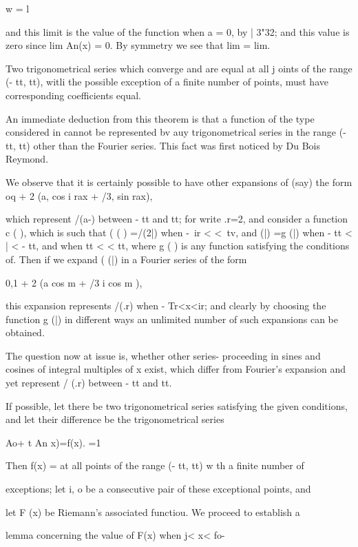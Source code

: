 {w = l

and this limit is the value of the function when a = 0, by | 3"32;
and this value is zero since lim An(x) = 0. By symmetry we see that
lim = lim.


Two trigonometrical series which converge and are equal at all j oints
of the range (- tt, tt), witli the possible exception of a finite
number of points, must have corresponding coefficients equal.

An immediate deduction from this theorem is that a function of the
type considered in cannot be represented bv auy trigonometrical
series in the range (- tt, tt) other than the Fourier series. This
fact was first noticed by Du Bois Reymond.

We observe that it is certainly possible to have other expansions of
(say) the form oq + 2 (a, cos i rax + /3, sin rax),

which represent /(a-) between - tt and tt; for write .r=2, and
consider a function c ( ), which is such that ( ( ) =/(2|) when -\ ir
< <\ tv, and (|) =g (|) when - tt < | < - tt, and when tt < < tt,
where g ( ) is any function satisfying the conditions of. Then
if we expand ( (|) in a Fourier series of the form

0,1 + 2 (a cos m + /3 i cos m ),

this expansion represents /(.r) when - Tr<x<ir; and clearly by
choosing the function g (|) in different ways an unlimited number of
such expansions can be obtained.

The question now at issue is, whether other series- proceeding in
sines and cosines of integral multiples of x exist, which differ from
Fourier's expansion and yet represent / (.r) between - tt and tt.

If possible, let there be two trigonometrical series satisfying the
given conditions, and let their difference be the trigonometrical
series

Ao+ t An x)=f(x). =1

Then f(x) = at all points of the range (- tt, tt) w th a finite number
of

exceptions; let i, o be a consecutive pair of these exceptional
points, and

let F (x) be Riemann's associated functiou. We proceed to establish a

lemma concerning the value of F(x) when j< x< fo-

}
